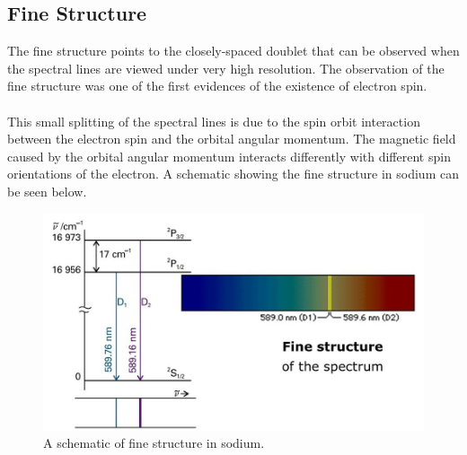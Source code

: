 		\subsection{Fine Structure}
			The fine structure points to the closely-spaced doublet that can be observed when the spectral lines are viewed under very high resolution. The observation of the fine structure was one of the first evidences of the existence of electron spin. 
			\\
			\\
			This small splitting of the spectral lines is due to the spin orbit interaction between the electron spin and the orbital angular momentum. The magnetic field caused by the orbital angular momentum interacts differently with different spin orientations of the electron. A schematic showing the fine structure in sodium can be seen below.
			\begin{figure}[h!]
				\centering
				\includegraphics[width=12cm]{images/sodium_fs.jpg}
				\caption{A schematic of fine structure in sodium.}
				\label{fig:na_fs}
			\end{figure}
